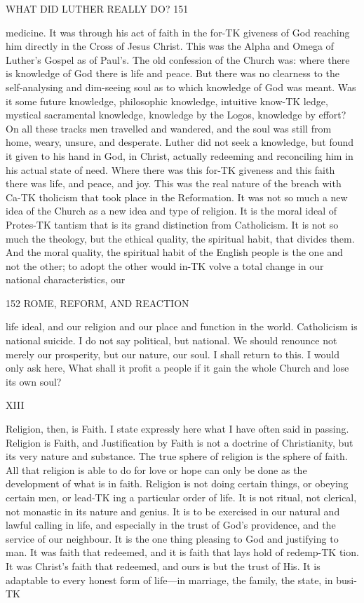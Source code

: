 \documentclass[12pt,a5paper,twoside]{book}
\begin{document}
{WHAT DID LUTHER REALLY DO? 151 

medicine. It was through his act of faith in the for-TK
giveness of God reaching him directly in the Cross of 
Jesus Christ. This was the Alpha and Omega of 
Luther's Gospel as of Paul's. The old confession of 
the Church was: where there is knowledge of God 
there is life and peace. But there was no clearness 
to the self-analysing and dim-seeing soul as to which 
knowledge of God was meant. Was it some future 
knowledge, philosophic knowledge, intuitive know-TK
ledge, mystical sacramental knowledge, knowledge by 
the Logos, knowledge by effort? On all these tracks 
men travelled and wandered, and the soul was still from 
home, weary, unsure, and desperate. Luther did not 
seek a knowledge, but found it given to his hand in 
God, in Christ, actually redeeming and reconciling him 
in his actual state of need. Where there was this for-TK
giveness and this faith there was life, and peace, and joy. 
This was the real nature of the breach with Ca-TK
tholicism that took place in the Reformation. It was 
not so much a new idea of the Church as a new idea 
and type of religion. It is the moral ideal of Protes-TK
tantism that is its grand distinction from Catholicism. 
It is not so much the theology, but the ethical quality, 
the spiritual habit, that divides them. And the moral 
quality, the spiritual habit of the English people is the 
one and not the other; to adopt the other would in-TK
volve a total change in our national characteristics, our 



152 ROME, REFORM, AND REACTION 

life ideal, and our religion and our place and function 
in the world. Catholicism is national suicide. I do 
not say political, but national. We should renounce 
not merely our prosperity, but our nature, our soul. I 
shall return to this. I would only ask here, What 
shall it profit a people if it gain the whole Church 
and lose its own soul? 

XIII 

Religion, then, is Faith. I state expressly here what 
I have often said in passing. Religion is Faith, and 
Justification by Faith is not a doctrine of Christianity, 
but its very nature and substance. The true sphere 
of religion is the sphere of faith. All that religion is 
able to do for love or hope can only be done as the 
development of what is in faith. Religion is not 
doing certain things, or obeying certain men, or lead-TK
ing a particular order of life. It is not ritual, not 
clerical, not monastic in its nature and genius. It is 
to be exercised in our natural and lawful calling in life, 
and especially in the trust of God's providence, and 
the service of our neighbour. It is the one thing 
pleasing to God and justifying to man. It was faith 
that redeemed, and it is faith that lays hold of redemp-TK
tion. It was Christ's faith that redeemed, and ours is 
but the trust of His. It is adaptable to every honest 
form of life---in marriage, the family, the state, in busi-TK



}
\end{document}
